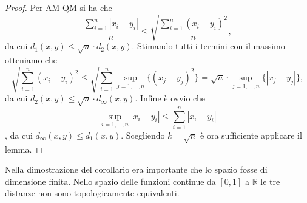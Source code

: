 \begin{proof}
    Per AM-QM si ha che $$\displaystyle \frac{\sum_{i=1}^n |x_i-y_i|}{n} \le
    \sqrt{\frac{\sum_{i=1}^n (x_i-y_i)^2}{n}},$$ da cui $d_1(x, y) \le \sqrt{n}
    \cdot d_2(x, y)$. Stimando tutti i termini con il massimo otteniamo che
    $$\displaystyle \sqrt{\sum_{i=1}^n (x_i-y_i)^2} \le \sqrt{\sum_{i=1}^n
    \sup_{j=1, \dots, n} \{(x_j-y_j)^2\}}=\sqrt{n} \cdot \sup_{j=1, \dots, n} \{
    |x_j-y_j| \},$$ da cui $d_2(x, y) \le \sqrt{n} \cdot d_{\infty} (x, y).$
    Infine è ovvio che $$\displaystyle \sup_{i=1, \dots, n} |x_i-y_i| \le
    \sum_{i=1}^n |x_i-y_i|$$, da cui $d_{\infty}(x, y) \le d_1(x, y).$
    Scegliendo $k=\sqrt{n}$ è ora sufficiente applicare il lemma.
\end{proof}

Nella dimostrazione del corollario era importante che lo spazio fosse di
dimensione finita. Nello spazio delle funzioni continue da $[0, 1]$ a
$\mathbb{R}$ le tre distanze non sono topologicamente equivalenti.
